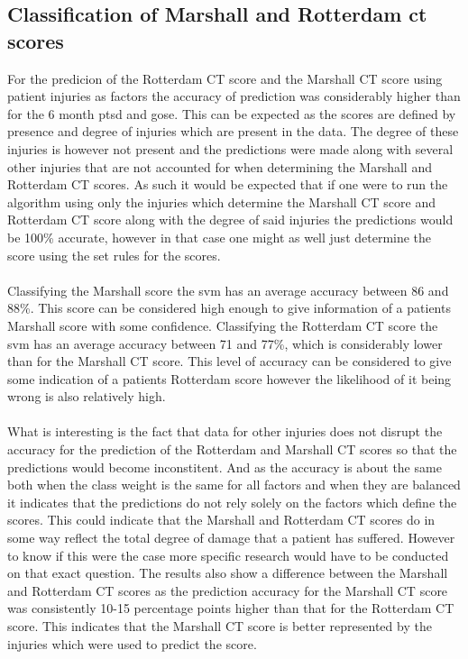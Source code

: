\documentclass[11pt]{article}
\begin{document}
\subsection{Classification of Marshall and Rotterdam \gls{ct} scores}
For the predicion of the Rotterdam CT score and the Marshall CT score using patient injuries as factors the accuracy of prediction was considerably higher than for the 6 month \gls{ptsd} and \gls{gose}. This can be expected as the scores are defined by presence and degree of injuries which are present in the data. The degree of these injuries is however not present and the predictions were made along with several other injuries that are not accounted for when determining the Marshall and Rotterdam CT scores. As such it would be expected that if one were to run the algorithm using only the injuries which determine the Marshall CT score and Rotterdam CT score along with the degree of said injuries the predictions would be 100\% accurate, however in that case one might as well just determine the score using the set rules for the scores.\\
\\
Classifying the Marshall score the \gls{svm} has an average accuracy between 86 and 88\%. This score can be considered high enough to give information of a patients Marshall score with some confidence. Classifying the Rotterdam CT score the \gls{svm} has an average accuracy between 71 and 77\%, which is considerably lower than for the Marshall CT score. This level of accuracy can be considered to give some indication of a patients Rotterdam score however the likelihood of it being wrong is also relatively high.\\
\\
What is interesting is the fact that data for other injuries does not disrupt the accuracy for the prediction of the Rotterdam and Marshall CT scores so that the predictions would become inconstitent. And as the accuracy is about the same both when the class weight is the same for all factors and when they are balanced it indicates that the predictions do not rely solely on the factors which define the scores. This could indicate that the Marshall and Rotterdam CT scores do in some way reflect the total degree of damage that a patient has suffered. However to know if this were the case more specific research would have to be conducted on that exact question. The results also show a difference between the Marshall and Rotterdam CT scores as the prediction accuracy for the Marshall CT score was consistently 10-15 percentage points higher than that for the Rotterdam CT score. This indicates that the Marshall CT score is better represented by the injuries which were used to predict the score.\\
\end{document}
